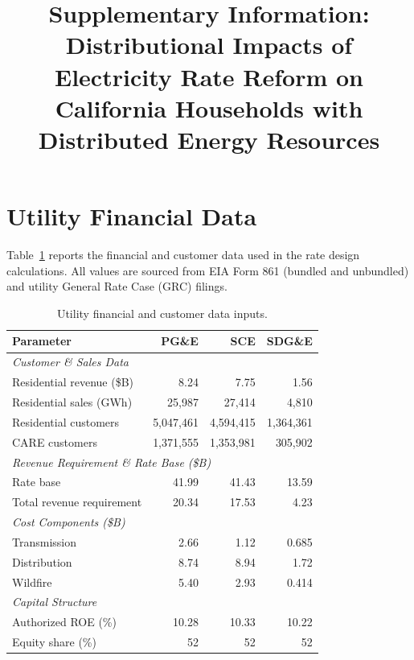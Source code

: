\documentclass[9pt]{article}
\title{Supplementary Information:\\Distributional Impacts of Electricity Rate Reform on California Households with Distributed Energy Resources}
\author{}
\date{}
\begin{document}
\maketitle

\tableofcontents
\newpage

\section{Utility Financial Data}

Table~\ref{tab:utility_data} reports the financial and customer data used in the rate design calculations. All values are sourced from EIA Form 861 (bundled and unbundled) and utility General Rate Case (GRC) filings.

\begin{table}[htbp]
\centering
\caption{Utility financial and customer data inputs.}
\label{tab:utility_data}
\begin{tabular}{l r r r}
\toprule
\textbf{Parameter} & \textbf{PG\&E} & \textbf{SCE} & \textbf{SDG\&E} \\
\midrule
\multicolumn{4}{l}{\textit{Customer \& Sales Data}} \\
Residential revenue (\$B) & 8.24 & 7.75 & 1.56 \\
Residential sales (GWh) & 25,987 & 27,414 & 4,810 \\
Residential customers & 5,047,461 & 4,594,415 & 1,364,361 \\
CARE customers & 1,371,555 & 1,353,981 & 305,902 \\
\midrule
\multicolumn{4}{l}{\textit{Revenue Requirement \& Rate Base (\$B)}} \\
Rate base & 41.99 & 41.43 & 13.59 \\
Total revenue requirement & 20.34 & 17.53 & 4.23 \\
\midrule
\multicolumn{4}{l}{\textit{Cost Components (\$B)}} \\
Transmission & 2.66 & 1.12 & 0.685 \\
Distribution & 8.74 & 8.94 & 1.72 \\
Wildfire & 5.40 & 2.93 & 0.414 \\
\midrule
\multicolumn{4}{l}{\textit{Capital Structure}} \\
Authorized ROE (\%) & 10.28 & 10.33 & 10.22 \\
Equity share (\%) & 52 & 52 & 52 \\
\bottomrule
\end{tabular}
\end{table}
\end{document}

